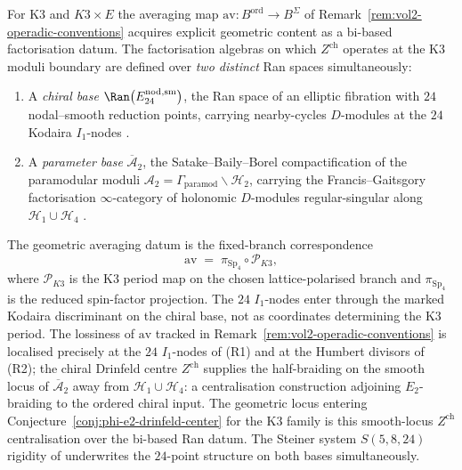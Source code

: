 \begin{remark}
\label{rem:e2-bi-based-ran}
For K3 and $K3 \times E$ the averaging map
$\mathrm{av} \colon B^{\mathrm{ord}} \to B^{\Sigma}$ of
Remark~\ref{rem:vol2-operadic-conventions} acquires explicit geometric content
as a bi-based factorisation datum. The factorisation algebras on which
$Z^{\mathrm{ch}}$ operates at the K3 moduli boundary are defined over
\emph{two distinct} Ran spaces simultaneously:
\begin{enumerate}[label=\textup{(R\arabic*)}]
 \item A \emph{chiral base}
 $\Ran\bigl(E^{\mathrm{nod,sm}}_{24}\bigr)$, the Ran space of an elliptic
 fibration with $24$ nodal--smooth reduction points, carrying
 nearby-cycles $D$-modules at the $24$ Kodaira $I_1$-nodes
 \cite{Kodaira1963}.
 \item A \emph{parameter base}
 $\overline{\mathcal{A}}_2$, the Satake--Baily--Borel compactification
 of the paramodular moduli
 $\mathcal{A}_2 = \Gamma_{\mathrm{paramod}} \backslash \mathcal{H}_2$,
 carrying the Francis--Gaitsgory factorisation $\infty$-category of
 holonomic $D$-modules regular-singular along
 $\mathcal{H}_1 \cup \mathcal{H}_4$ \cite{FrancisGaitsgory2012}.
\end{enumerate}
The geometric averaging datum is the fixed-branch correspondence
\[
 \mathrm{av}
 \;=\; \pi_{\mathrm{Sp}_4}\circ\mathscr P_{K3},
\]
where \(\mathscr P_{K3}\) is the K3 period map on the chosen lattice-polarised branch and \(\pi_{\mathrm{Sp}_4}\) is the reduced spin-factor projection. The \(24\) \(I_1\)-nodes enter through the marked Kodaira discriminant on the chiral base, not as coordinates determining the K3 period.
The lossiness of $\mathrm{av}$ tracked in
Remark~\ref{rem:vol2-operadic-conventions} is localised precisely at the $24$
$I_1$-nodes of (R1) and at the Humbert divisors of (R2); the chiral Drinfeld centre $Z^{\mathrm{ch}}$ supplies the half-braiding
on the smooth locus of $\overline{\mathcal{A}}_2$ away from
$\mathcal{H}_1 \cup \mathcal{H}_4$: a centralisation construction
adjoining $E_2$-braiding to the ordered chiral input. The
geometric locus entering Conjecture~\ref{conj:phi-e2-drinfeld-center}
for the K3 family is this smooth-locus $Z^{\mathrm{ch}}$ centralisation
over the bi-based Ran datum. The
Steiner system $S(5,8,24)$ rigidity of \cite{ConwaySloane1988} underwrites
the $24$-point structure on both bases simultaneously.
\end{remark}

